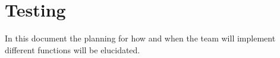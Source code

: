 \chapter{Testing}
\label{sec:test}
In this document the planning for how and when the team will implement different functions will be elucidated.